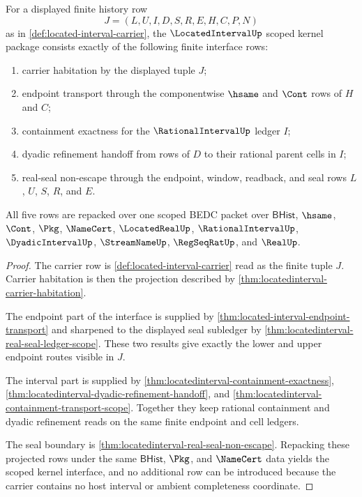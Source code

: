 \begin{theorem}
\label{thm:locatedinterval-kernel-scope-package}
For a displayed finite history row
$$
J=(L,U,I,D,S,R,E,H,C,P,N)
$$
as in \autoref{def:located-interval-carrier}, the $\LocatedIntervalUp$ scoped kernel package consists exactly of the following finite interface rows:
\begin{enumerate}
\item carrier habitation by the displayed tuple $J$;
\item endpoint transport through the componentwise $\hsame$ and $\Cont$ rows of $H$ and $C$;
\item containment exactness for the $\RationalIntervalUp$ ledger $I$;
\item dyadic refinement handoff from rows of $D$ to their rational parent cells in $I$;
\item real-seal non-escape through the endpoint, window, readback, and seal rows $L$, $U$, $S$, $R$, and $E$.
\end{enumerate}
All five rows are repacked over one scoped BEDC packet over $\mathsf{BHist}$, $\hsame$, $\Cont$, $\Pkg$, $\NameCert$, $\LocatedRealUp$, $\RationalIntervalUp$, $\DyadicIntervalUp$, $\StreamNameUp$, $\RegSeqRatUp$, and $\RealUp$.
\end{theorem}
\begin{proof}
The carrier row is \autoref{def:located-interval-carrier} read as the finite tuple $J$. Carrier habitation is then the projection described by \autoref{thm:locatedinterval-carrier-habitation}.

The endpoint part of the interface is supplied by \autoref{thm:located-interval-endpoint-transport} and sharpened to the displayed seal subledger by \autoref{thm:locatedinterval-real-seal-ledger-scope}. These two results give exactly the lower and upper endpoint routes visible in $J$.

The interval part is supplied by \autoref{thm:locatedinterval-containment-exactness}, \autoref{thm:locatedinterval-dyadic-refinement-handoff}, and \autoref{thm:locatedinterval-containment-transport-scope}. Together they keep rational containment and dyadic refinement reads on the same finite endpoint and cell ledgers.

The seal boundary is \autoref{thm:locatedinterval-real-seal-non-escape}. Repacking these projected rows under the same $\mathsf{BHist}$, $\Pkg$, and $\NameCert$ data yields the scoped kernel interface, and no additional row can be introduced because the carrier contains no host interval or ambient completeness coordinate.
\end{proof}

